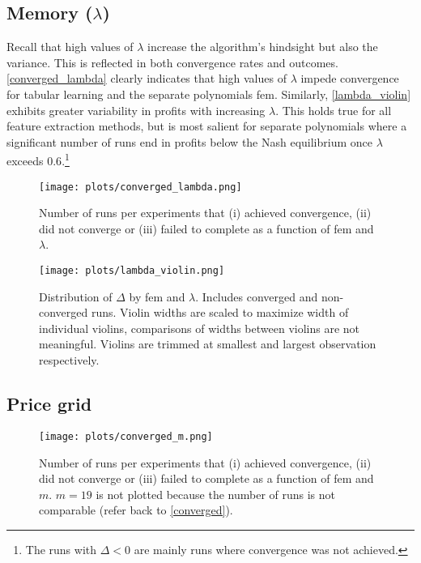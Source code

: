 \clearpage

\subsection{Memory ($\lambda$)}\label{lambda_appendix}

Recall that high values of $\lambda$ increase the algorithm's hindsight but also the variance. This is reflected in both convergence rates and outcomes. \autoref{converged_lambda} clearly indicates that high values of $\lambda$ impede convergence for tabular learning and the separate polynomials \gls{fem}. Similarly, \autoref{lambda_violin} exhibits greater variability in profits with increasing $\lambda$. This holds true for all feature extraction methods, but is most salient for separate polynomials where a significant number of runs end in profits below the Nash equilibrium once $\lambda$ exceeds $0.6$.\footnote{The runs with $\Delta <0$ are mainly runs where convergence was not achieved.}

\begin{figure}
	\texttt{[image: plots/converged\_lambda.png]}
	\caption[Converged runs by \gls{fem} and $\lambda$]{Number of runs per experiments that (i) achieved convergence, (ii) did not converge or (iii) failed to complete as a function of \gls{fem} and $\lambda$.}
	\label{converged_lambda}
\end{figure}


\begin{figure}
	\texttt{[image: plots/lambda\_violin.png]}
	\caption[Distribution of $\Delta$ by \gls{fem} and $\lambda$]{Distribution of $\Delta$ by \gls{fem} and $\lambda$. Includes converged and non-converged runs. Violin widths are scaled to maximize width of individual violins, comparisons of widths between violins are not meaningful. Violins are trimmed at smallest and largest observation respectively.}
	\label{lambda_violin}
\end{figure}

\clearpage

\subsection{Price grid}\label{price_grid_appendix}

\begin{figure}
	\texttt{[image: plots/converged\_m.png]}
	\caption[Converged runs by \gls{fem} and $m$]{Number of runs per experiments that (i) achieved convergence, (ii) did not converge or (iii) failed to complete as a function of \gls{fem} and $m$. $m = 19$ is not plotted because the number of runs is not comparable (refer back to \autoref{converged}).}
	\label{converged_m}
\end{figure}

